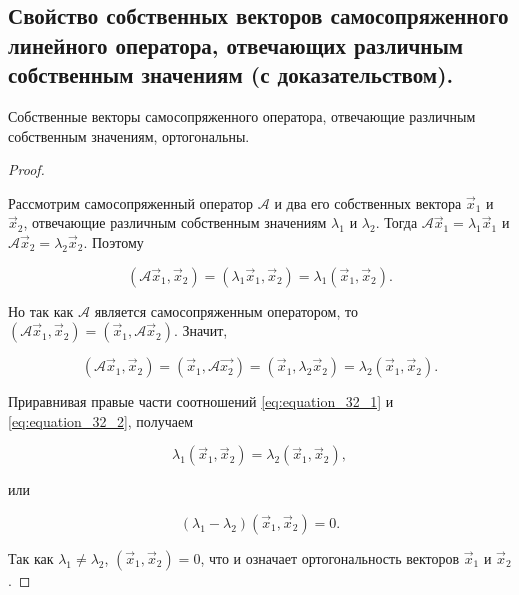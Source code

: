 \subsection{
    Свойство собственных векторов самосопряженного линейного оператора, отвечающих различным собственным значениям (с доказательством).
}

\begin{theorem}
    Собственные векторы самосопряженного оператора, отвечающие различным собственным значениям, ортогональны.
\end{theorem}

\begin{proof}~

    Рассмотрим самосопряженный оператор $\mathscr{A}$ и два его собственных вектора $\vec{x}_1$ и $\vec{x}_2$, отвечающие различным собственным значениям $\lambda_1$ и $\lambda_2$. Тогда $\mathscr{A}\vec{x}_1 = \lambda_1\vec{x}_1$ и $\mathscr{A}\vec{x}_2 = \lambda_2\vec{x}_2$. Поэтому

    \begin{equation}
        (\mathscr{A}\vec{x}_1, \vec{x}_2) = (\lambda_1\vec{x}_1, \vec{x}_2) = \lambda_1(\vec{x}_1, \vec{x}_2).
        \label{eq:equation_32_1}
    \end{equation}

    Но так как $\mathscr{A}$ является самосопряженным оператором, то $(\mathscr{A}\vec{x}_1, \vec{x}_2) = (\vec{x}_1, \mathscr{A}\vec{x}_2)$. Значит,

    \begin{equation}
        (\mathscr{A}\vec{x}_1, \vec{x}_2) = (\vec{x}_1, \mathscr{A}\vec{x_2}) = (\vec{x}_1, \lambda_2\vec{x}_2) = \lambda_2(\vec{x}_1, \vec{x}_2).
        \label{eq:equation_32_2}
    \end{equation}

    Приравнивая правые части соотношений \eqref{eq:equation_32_1} и \eqref{eq:equation_32_2}, получаем

    $$\lambda_1(\vec{x}_1, \vec{x}_2) = \lambda_2(\vec{x}_1, \vec{x}_2),$$

    или

    $$(\lambda_1 - \lambda_2)(\vec{x}_1, \vec{x}_2) = 0.$$

    Так как $\lambda_1 \ne \lambda_2$, $(\vec{x}_1, \vec{x}_2) = 0$, что и означает ортогональность векторов $\vec{x}_1$ и $\vec{x}_2$.
\end{proof}
